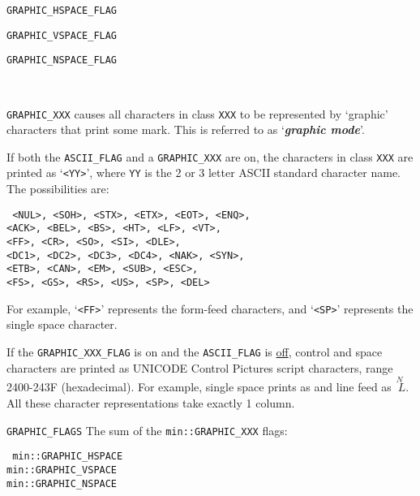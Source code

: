 \documentclass[12pt]{article}
\makeatletter
\newcommand{\key}[1]{{\bf \em #1}\index{#1}}
\newcommand{\ttnbmkey}[2]{{\tt #1}\index{#1@{\tt #1}!#2}}
\newenvironment{indpar}[1][0.3in]%
	{\begin{list}{}%
		     {\setlength{\itemsep}{0in}%
		      \setlength{\topsep}{0in}%
		      \setlength{\parsep}{1ex}%
		      \setlength{\labelwidth}{#1}%
		      \setlength{\leftmargin}{#1}%
		      \addtolength{\leftmargin}{\labelsep}}%
	 \item}%
	{\end{list}}
\newenvironment{itemlist}[1][1.2in]%
	{\begin{list}{}{\setlength{\labelwidth}{#1}%
		        \setlength{\leftmargin}{\labelwidth}%
		        \addtolength{\leftmargin}{+0.2in}%
		        \renewcommand{\makelabel}[1]{##1\hfill}}}%
	{\end{list}}
\makeatother
\begin{document}
\begin{indpar}\begin{itemlist}[1.4in]

\item[\ttnbmkey{GRAPHIC\_HSPACE\_FLAG}{{\tt min::printer\_parameters} flag}]
\item[\ttnbmkey{GRAPHIC\_VSPACE\_FLAG}{{\tt min::printer\_parameters} flag}]
\item[\ttnbmkey{GRAPHIC\_NSPACE\_FLAG}{{\tt min::printer\_parameters} flag}]
{\raggedright~\\}
{\tt GRAPHIC\_XXX} causes all characters in class {\tt XXX} to be
represented by `graphic' characters that print some mark.
This is referred to as `\key{graphic mode}'.

If both the {\tt ASCII\_FLAG} and a {\tt GRAPHIC\_XXX} are on,
the characters in class {\tt XXX} are printed as `{\tt <YY>}',
where {\tt YY} is the 2 or 3 letter ASCII standard character name.
The possibilities are:
\begin{indpar} \tt
    <NUL>, <SOH>, <STX>, <ETX>, <EOT>, <ENQ>, \\
    <ACK>, <BEL>, <BS>, <HT>, <LF>, <VT>, \\
    <FF>, <CR>, <SO>, <SI>, <DLE>, \\
    <DC1>, <DC2>, <DC3>, <DC4>, <NAK>, <SYN>, \\
    <ETB>, <CAN>, <EM>, <SUB>, <ESC>, \\
    <FS>, <GS>, <RS>, <US>, <SP>, <DEL>
\end{indpar}

For example, `{\tt <FF>}' represents the form-feed characters, and
`{\tt <SP>}' represents the single space character.

If the {\tt GRAPHIC\_XXX\_FLAG} is on and the {\tt ASCII\_FLAG} is
\underline{off}, control and space characters are
printed as UNICODE Control Pictures script characters,
range 2400-243F (hexadecimal).
For example, single space prints as {\tt \textvisiblespace} and
line feed as {\tiny $\stackrel{\textstyle N~}{~L}$}.
All these character representations take exactly 1 column.

\item[\ttnbmkey{GRAPHIC\_FLAGS}{{\tt min::printer\_parameters} flag}]
The sum of the {\tt min::GRAPHIC\_XXX} flags:
\begin{indpar}
\tt
min::GRAPHIC\_HSPACE \\
min::GRAPHIC\_VSPACE \\
min::GRAPHIC\_NSPACE
\end{indpar}


\end{itemlist}
\end{indpar}
\end{document}
